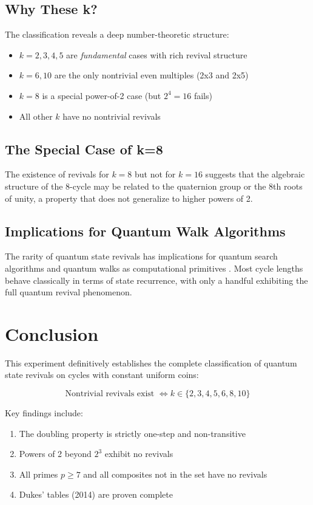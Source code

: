 \documentclass[12pt]{article}
\begin{document}
\subsection{Why These k?}

The classification reveals a deep number-theoretic structure:

\begin{itemize}
    \item \(k=2,3,4,5\) are \textit{fundamental} cases with rich revival structure
    \item \(k=6,10\) are the only nontrivial even multiples (2x3 and 2x5)
    \item \(k=8\) is a special power-of-2 case (but \(2^4=16\) fails)
    \item All other \(k\) have no nontrivial revivals
\end{itemize}

\subsection{The Special Case of k=8}

The existence of revivals for \(k=8\) but not for \(k=16\) suggests that the algebraic structure of the 8-cycle may be related to the quaternion group or the 8th roots of unity, a property that does not generalize to higher powers of 2.

\subsection{Implications for Quantum Walk Algorithms}

The rarity of quantum state revivals has implications for quantum search algorithms \cite{shenvi2003} and quantum walks as computational primitives \cite{childs2003}. Most cycle lengths behave classically in terms of state recurrence, with only a handful exhibiting the full quantum revival phenomenon.

\section{Conclusion}

This experiment definitively establishes the complete classification of quantum state revivals on cycles with constant uniform coins:

\[
\boxed{\text{Nontrivial revivals exist } \iff k \in \{2,3,4,5,6,8,10\}}
\]

Key findings include:
\begin{enumerate}
    \item The doubling property is strictly one-step and non-transitive
    \item Powers of 2 beyond \(2^3\) exhibit no revivals
    \item All primes \(p \ge 7\) and all composites not in the set have no revivals
    \item Dukes' tables (2014) are proven complete
\end{enumerate}
\end{document}
